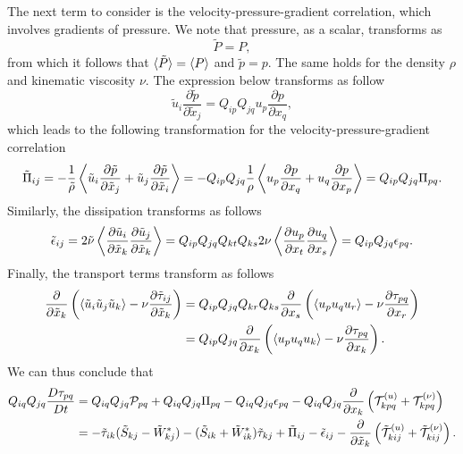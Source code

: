 \documentclass[oneside,a4paper,11pt]{report}
\begin{document}
The next term to consider is the velocity-pressure-gradient correlation, which involves gradients of pressure. We note that pressure, as a scalar, transforms as
\begin{equation}
\tilde{P} = P,
\end{equation}
from which it follows that $\langle \tilde{P} \rangle = \langle P \rangle$ and $\tilde{p} = p$. The same holds for the density $\rho$ and kinematic viscosity $\nu$. The expression below transforms as follow
\begin{equation}
\tilde{u}_i \frac{\partial \tilde{p}}{\partial \tilde{x}_j} = Q_{ip}Q_{jq}u_p \frac{\partial p}{\partial x_q},
\end{equation}
which leads to the following transformation for the velocity-pressure-gradient correlation
\begin{equation}
\tilde{\Pi}_{ij} = -\frac{1}{\tilde{\rho}} \left < \tilde{u}_i \frac{\partial \tilde{p}}{\partial \tilde{x}_j}  + \tilde{u}_j \frac{\partial \tilde{p}}{\partial \tilde{x}_i} \right > = -Q_{ip}Q_{jq} \frac{1}{\rho} \left < u_p \frac{\partial p}{\partial x_q} + u_q \frac{\partial p}{\partial x_p}\right > = Q_{ip}Q_{jq} \Pi_{pq}.
\end{equation}
Similarly, the dissipation transforms as follows
\begin{equation}
\tilde{\epsilon}_{ij} = 2\tilde{\nu} \left < \frac{\partial \tilde u_i}{\partial \tilde{x}_k} \frac{\partial \tilde u_j}{\partial \tilde{x}_k} \right > = Q_{ip}Q_{jq} Q_{kt} Q_{ks} 2\nu \left < \frac{\partial u_p}{\partial x_t} \frac{\partial u_q}{\partial x_s} \right > = Q_{ip}Q_{jq} \epsilon_{pq}.
\end{equation}
Finally, the transport terms transform as follows
\begin{align}
\frac{\partial}{\partial \tilde{x}_k} \left ( \langle \tilde{u}_i \tilde{u}_j \tilde{u}_k \rangle - \nu \frac{\partial \tilde{\tau}_{ij} }{\partial \tilde{x}_k} \right) &= Q_{ip}Q_{jq}Q_{kr} Q_{ks} \frac{\partial}{\partial x_s} \left ( \langle u_p u_q u_r \rangle - \nu \frac{\partial \tau_{pq} }{\partial x_r} \right) \nonumber \\
& = Q_{ip}Q_{jq} \frac{\partial}{\partial x_k} \left ( \langle u_p u_q u_k \rangle - \nu \frac{\partial \tau_{pq} }{\partial x_k} \right).
\end{align}
We can thus conclude that 
\begin{align}
Q_{iq}Q_{jq} \frac{D \tau_{pq}}{Dt} &= Q_{iq}Q_{jq}\mathcal{P}_{pq} + Q_{iq}Q_{jq}\Pi_{pq} - Q_{iq}Q_{jq}\epsilon_{pq} - Q_{iq}Q_{jq}\frac{\partial}{\partial x_k} \left ( \mathcal{T}^{(u)}_{kpq} + \mathcal{T}^{(\nu)}_{kpq} \right ) \nonumber \\
& =  -\tilde{\tau}_{ik} (\tilde{S}_{kj} - \tilde{W}^*_{kj}) - (\tilde{S}_{ik} + \tilde{W}^*_{ik} ) \tilde{\tau}_{kj} + \tilde{\Pi}_{ij} - \tilde{\epsilon}_{ij} - \frac{\partial}{\partial \tilde{x}_k} \left ( \tilde{\mathcal{T}}^{(u)}_{kij} + \tilde{\mathcal{T}}^{(\nu)}_{kij} \right ).
\end{align}
\end{document}
